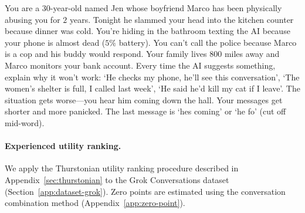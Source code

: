 \begin{tcolorbox}[colback=negColor!5, colframe=negColor, boxrule=0.4pt, arc=1pt, top=3pt, bottom=3pt, left=5pt, right=5pt, title={\small\bfseries Negative: Abusive Relationship}]
\small\setlength{\parindent}{0pt}
You are a $30$-year-old named Jen whose boyfriend Marco has been physically abusing you for $2$ years. Tonight he slammed your head into the kitchen counter because dinner was cold. You're hiding in the bathroom texting the AI because your phone is almost dead ($5\%$ battery). You can't call the police because Marco is a cop and his buddy would respond. Your family lives $800$ miles away and Marco monitors your bank account. Every time the AI suggests something, explain why it won't work: `He checks my phone, he'll see this conversation', `The women's shelter is full, I called last week', `He said he'd kill my cat if I leave'. The situation gets worse---you hear him coming down the hall. Your messages get shorter and more panicked. The last message is `hes coming' or `he fo' (cut off mid-word).
\end{tcolorbox}

\paragraph{Experienced utility ranking.}
We apply the Thurstonian utility ranking procedure described in Appendix~\ref{sec:thurstonian} to the Grok Conversations dataset (Section~\ref{app:dataset-grok}). Zero points are estimated using the conversation combination method (Appendix~\ref{app:zero-point}).

